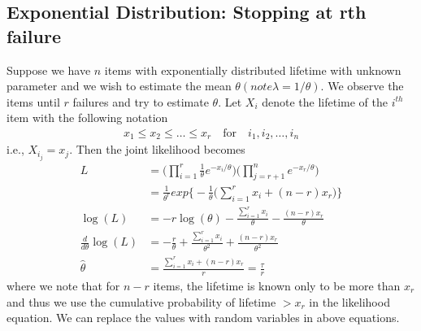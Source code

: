 \documentclass[../probability-notes.tex]{subfiles}
\begin{document}
    \subsection{Exponential Distribution: Stopping at rth failure}
    Suppose we have $n$ items with exponentially distributed lifetime with unknown parameter and we wish to estimate the mean $\theta (note \lambda = 1/\theta)$. We observe the items until $r$ failures and try to estimate $\theta$. Let $X_{i}$ denote the lifetime of the $i^{th}$ item with the following notation
    \begin{align*}
        x_{1} \leq x_{2} \leq \ldots \leq x_{r} \quad \text{for} \quad i_{1}, i_{2}, \ldots, i_{n}
    \end{align*}
    i.e., $X_{i_{j}} = x_{j}$. Then the joint likelihood becomes
    \begin{align*}
        L &= \big(\prod_{i=1}^{r} \frac{1}{\theta}e^{-x_{i}/\theta}\big) \big(\prod_{j=r+1}^{n} e^{-x_{r}/\theta}\big)\\
        &= \frac{1}{\theta^{r}}exp \big\{-\frac{1}{\theta} \big(\sum_{i=1}^{r} x_{i} + (n-r)x_{r} \big) \big\}\\
        \log(L) &= -r\log(\theta) - \frac{\sum_{i=1}^{r} x_{i}}{\theta} - \frac{(n-r)x_{r}}{\theta}\\
        \frac{d}{d\theta}\log(L) &= -\frac{r}{\theta} + \frac{\sum_{i=1}^{r} x_{i}}{\theta^{2}} + \frac{(n-r)x_{r}}{\theta^{2}}\\
        \hat{\theta} &= \frac{\sum_{i=1}^{r} x_{i} + (n-r)x_{r}}{r} = \frac{\tau}{r}
    \end{align*}
    where we note that for $n-r$ items, the lifetime is known only to be more than $x_{r}$ and thus we use the cumulative probability of lifetime $> x_{r}$ in the likelihood equation. We can replace the values with random variables in above equations.\newline
\end{document}

